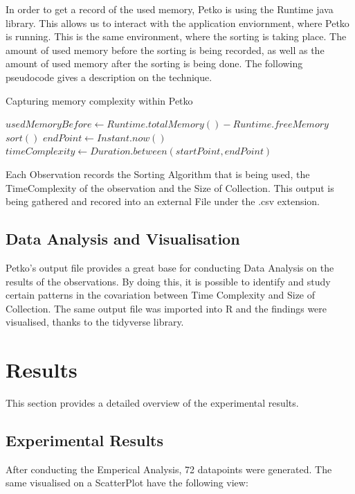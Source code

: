 \documentclass[]{report}
\begin{document}
In order to get a record of the used memory, Petko is using the Runtime java library. This allows us to interact with the application enviornment, where Petko is running. This is the same environment, where the sorting is taking place. The amount of used memory before the sorting is being recorded, as well as the amount of used memory after the sorting is being done. The following pseudocode gives a description on the technique. \\


\begin{algorithm}
	\caption{Capturing memory complexity within Petko}\label{alg:cap}
	\begin{algorithmic}
		\State $usedMemoryBefore \gets Runtime.totalMemory() - Runtime.freeMemory$    
		\State $sort()$ 
		\State $endPoint \gets Instant.now()$  
		\State $timeComplexity \gets Duration.between(startPoint, endPoint)$
	\end{algorithmic}
\end{algorithm}

	\newpage
		 Each Observation records the Sorting Algorithm that is being used, the TimeComplexity of the observation and the Size of Collection. This output is being gathered and recored into an external File under the .csv extension. 
		\subsection{Data Analysis and Visualisation}
		Petko's output file provides a great base for conducting Data Analysis on the results of the observations. By doing this, it is possible to identify and study certain patterns in the covariation between Time Complexity and Size of Collection. The same output file was imported into R and the findings were visualised, thanks to the tidyverse library.
		\section{Results}
	This section provides a detailed overview of the experimental results.
\subsection{Experimental Results}
After conducting the Emperical Analysis, 72 datapoints were generated. The same visualised on a ScatterPlot have the following view:
\end{document}
